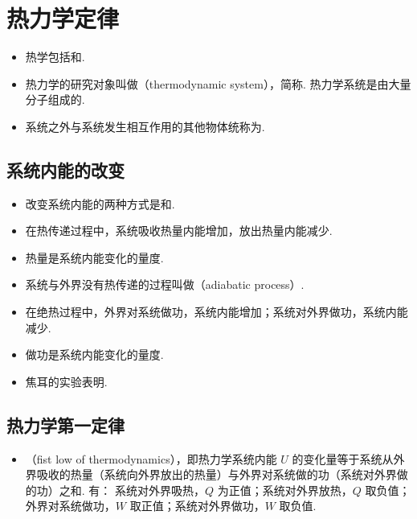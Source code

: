\newpage
\section{热力学定律}

\vspace{10pt}
\begin{itemize}
\item 热学包括和.
\item 热力学的研究对象叫做（thermodynamic system），简称. 热力学系统是由大量分子组成的.
\item 系统之外与系统发生相互作用的其他物体统称为.
\end{itemize}

\subsection{系统内能的改变}
\vspace{10pt}
\begin{itemize}
\item 改变系统内能的两种方式是和.
\item 在热传递过程中，系统吸收热量内能增加，放出热量内能减少.
\item 热量是系统内能变化的量度.
\item 系统与外界没有热传递的过程叫做（adiabatic process）.
\item 在绝热过程中，外界对系统做功，系统内能增加；系统对外界做功，系统内能减少.
\item 做功是系统内能变化的量度.
\item 焦耳的实验表明.
\end{itemize}

\subsection{热力学第一定律}
\vspace{10pt}
\begin{itemize}
\item {}（fist low of thermodynamics），即热力学系统内能 $U$ 的变化量等于系统从外界吸收的热量（系统向外界放出的热量）与外界对系统做的功（系统对外界做的功）之和. 有：
\newline 系统对外界吸热，$Q$ 为正值；系统对外界放热，$Q$ 取负值；外界对系统做功，$W$ 取正值；系统对外界做功，$W$ 取负值.
\end{itemize}

